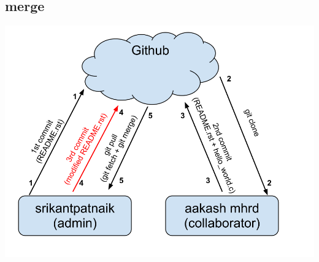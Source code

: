 \documentclass[letterpaper,10pt,english]{sphinxmanual}
\begin{document}
\subsection{merge}
\label{version-control:merge}
\includegraphics[width=1.000\linewidth]{git-collaboration-merge.png}
\end{document}

